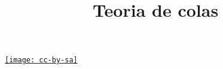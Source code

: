 \documentclass[aspectratio=169]{beamer}
\title{Teoria de colas}
\date{}
\begin{document}
\begin{frame}
	\titlepage
	\begin{center}
		\href{http://creativecommons.org/licenses/by-sa/3.0/es/}{\texttt{[image: cc-by-sa]}}
	\end{center}
\end{frame}






















\end{document}
